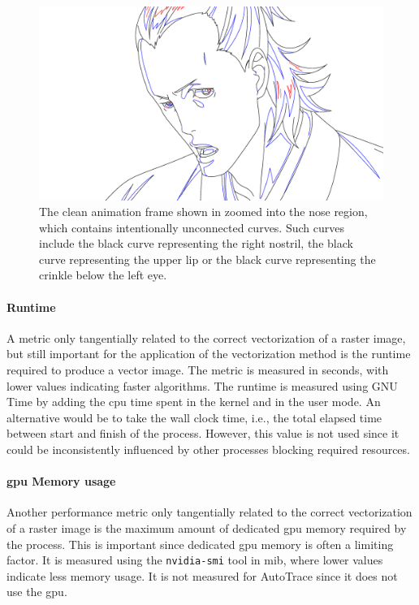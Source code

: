 \begin{figure}
    \centering
    \includegraphics[height=.25\textheight,trim={17em 7em 25em 14em},clip]{graphics/douga/49.pdf}
    \caption{The clean animation frame shown in  zoomed into the nose region, which contains intentionally unconnected curves. Such curves include the black curve representing the right nostril, the black curve representing the upper lip or the black curve representing the crinkle below the left eye.}
    \label{fig:intentional.hole}
\end{figure}

\paragraph{Runtime}
A metric only tangentially related to the correct vectorization of a raster image, but still important for the application of the vectorization method is the runtime required to produce a vector image. The metric is measured in seconds, with lower values indicating faster algorithms. The runtime is measured using GNU Time \citep{gnutime} by adding the \gls{cpu} time spent in the kernel and in the user mode. An alternative would be to take the wall clock time, i.e., the total elapsed time between start and finish of the process. However, this value is not used since it could be inconsistently influenced by other processes blocking required resources.

\paragraph{\gls{gpu} Memory usage}
Another performance metric only tangentially related to the correct vectorization of a raster image is the maximum amount of dedicated \gls{gpu} memory required by the process. This is important since dedicated \gls{gpu} memory is often a limiting factor. It is measured using the \texttt{nvidia-smi} tool in \gls{mib}, where lower values indicate less memory usage. It is not measured for AutoTrace \citep{autotrace} since it does not use the \gls{gpu}.


